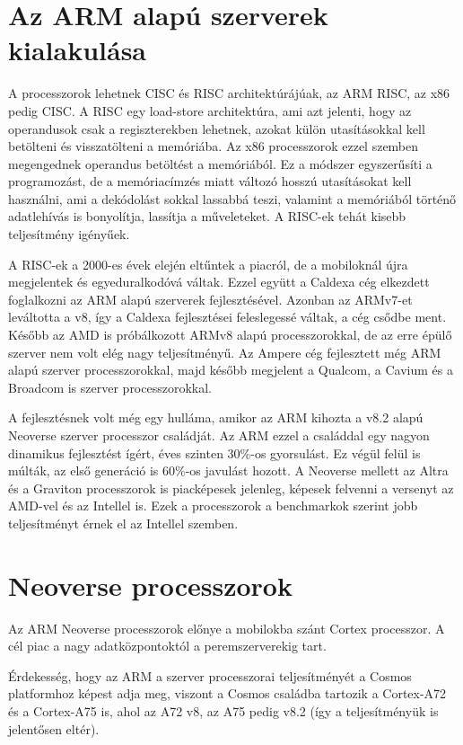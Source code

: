 \section{Az ARM alapú szerverek kialakulása}
A processzorok lehetnek CISC és RISC architektúrájúak, az ARM RISC, az x86 pedig CISC.
A RISC egy load-store architektúra, ami azt jelenti, hogy az operandusok csak a regiszterekben lehetnek, azokat külön utasításokkal kell betölteni és visszatölteni a memóriába.
Az x86 processzorok ezzel szemben megengednek operandus betöltést a memóriából.
Ez a módszer egyszerűsíti a programozást, de a memóriacímzés miatt változó hosszú utasításokat kell használni, ami a dekódolást sokkal lassabbá teszi, valamint a memóriából történő adatlehívás is bonyolítja, lassítja a műveleteket.
A RISC-ek tehát kisebb teljesítmény igényűek.

A RISC-ek a 2000-es évek elején eltűntek a piacról, de a mobiloknál újra megjelentek és egyeduralkodóvá váltak.
Ezzel együtt a Caldexa cég elkezdett foglalkozni az ARM alapú szerverek fejlesztésével.
Azonban az ARMv7-et leváltotta a v8, így a Caldexa fejlesztései feleslegessé váltak, a cég csődbe ment.
Később az AMD is próbálkozott ARMv8 alapú processzorokkal, de az erre épülő szerver nem volt elég nagy teljesítményű.
Az Ampere cég fejlesztett még ARM alapú szerver processzorokkal, majd később megjelent a Qualcom, a Cavium és a Broadcom is szerver processzorokkal.

A fejlesztésnek volt még egy hulláma, amikor az ARM kihozta a v8.2 alapú Neoverse szerver processzor családját.
Az ARM ezzel a családdal egy nagyon dinamikus fejlesztést ígért, éves szinten 30\%-os gyorsulást.
Ez végül felül is múlták, az első generáció is 60\%-os javulást hozott.
A Neoverse mellett az Altra és a Graviton processzorok is piacképesek jelenleg, képesek felvenni a versenyt az AMD-vel és az Intellel is.
Ezek a processzorok a benchmarkok szerint jobb teljesítményt érnek el az Intellel szemben.

\section{Neoverse processzorok}
Az ARM Neoverse processzorok előnye a mobilokba szánt Cortex processzor.
A cél piac a nagy adatközpontoktól a peremszerverekig tart.

Érdekesség, hogy az ARM a szerver processzorai teljesítményét a Cosmos platformhoz képest adja meg, viszont a Cosmos családba tartozik a Cortex-A72 és a Cortex-A75 is, ahol az A72 v8, az A75 pedig v8.2 (így a teljesítményük is jelentősen eltér).

